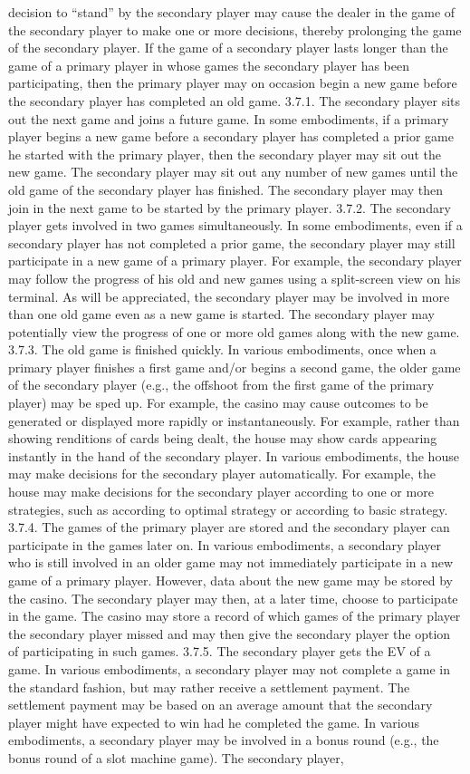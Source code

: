 \documentclass[11pt,a4paper]{article}
\begin{document}
decision to “stand” by the secondary player may cause the dealer in the game of the secondary player to make one or more decisions, thereby prolonging the game of the secondary player. If the game of a secondary player lasts longer than the game of a primary player in whose games the secondary player has been participating, then the primary player may on occasion begin a new game before the secondary player has completed an old game. 3.7.1. The secondary player sits out the next game and joins a future game. In some embodiments, if a primary player begins a new game before a secondary player has completed a prior game he started with the primary player, then the secondary player may sit out the new game. The secondary player may sit out any number of new games until the old game of the secondary player has finished. The secondary player may then join in the next game to be started by the primary player. 3.7.2. The secondary player gets involved in two games simultaneously. In some embodiments, even if a secondary player has not completed a prior game, the secondary player may still participate in a new game of a primary player. For example, the secondary player may follow the progress of his old and new games using a split-screen view on his terminal. As will be appreciated, the secondary player may be involved in more than one old game even as a new game is started. The secondary player may potentially view the progress of one or more old games along with the new game. 3.7.3. The old game is finished quickly. In various embodiments, once when a primary player finishes a first game and/or begins a second game, the older game of the secondary player (e.g., the offshoot from the first game of the primary player) may be sped up. For example, the casino may cause outcomes to be generated or displayed more rapidly or instantaneously. For example, rather than showing renditions of cards being dealt, the house may show cards appearing instantly in the hand of the secondary player. In various embodiments, the house may make decisions for the secondary player automatically. For example, the house may make decisions for the secondary player according to one or more strategies, such as according to optimal strategy or according to basic strategy. 3.7.4. The games of the primary player are stored and the secondary player can participate in the games later on. In various embodiments, a secondary player who is still involved in an older game may not immediately participate in a new game of a primary player. However, data about the new game may be stored by the casino. The secondary player may then, at a later time, choose to participate in the game. The casino may store a record of which games of the primary player the secondary player missed and may then give the secondary player the option of participating in such games. 3.7.5. The secondary player gets the EV of a game. In various embodiments, a secondary player may not complete a game in the standard fashion, but may rather receive a settlement payment. The settlement payment may be based on an average amount that the secondary player might have expected to win had he completed the game. In various embodiments, a secondary player may be involved in a bonus round (e.g., the bonus round of a slot machine game). The secondary player, 
\end{document}
